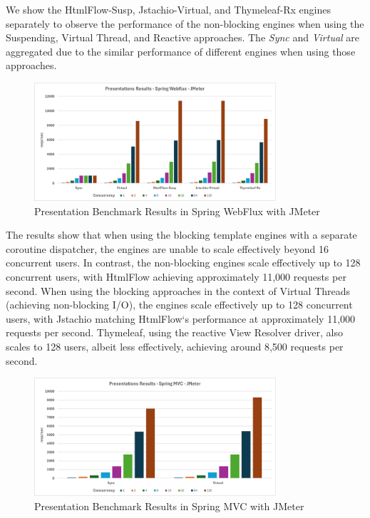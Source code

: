 We show the HtmlFlow-Susp, Jstachio-Virtual, and Thymeleaf-Rx engines
separately to observe the performance of the non-blocking engines when using
the Suspending, Virtual Thread, and Reactive approaches. The \textit{Sync} and
\textit{Virtual} are aggregated due to the similar performance of different
engines when using those approaches.

\begin{figure}[h]
     \isPreprints{\centering}{}
     \includegraphics[width=0.8\textwidth]{./Graphs/presentations-webflux-jmeter.png}
     \caption{Presentation Benchmark Results in Spring WebFlux with JMeter}\label{fig:presentations-webflux-jmeter}
\end{figure}

The results show that when using the blocking template engines with a separate
coroutine dispatcher, the engines are unable to scale effectively beyond 16
concurrent users. In contrast, the non-blocking engines scale effectively up to
128 concurrent users, with HtmlFlow achieving approximately 11,000 requests per
second. When using the blocking approaches in the context of Virtual Threads
(achieving non-blocking I/O), the engines scale effectively up to 128
concurrent users, with Jstachio matching HtmlFlow`s performance at
approximately 11,000 requests per second. Thymeleaf, using the reactive View
Resolver driver, also scales to 128 users, albeit less effectively, achieving
around 8,500 requests per second.

\begin{figure}[h]
     \isPreprints{\centering}{}
     \includegraphics[width=0.8\textwidth]{./Graphs/presentations-springmvc-jmeter.png}
     \caption{Presentation Benchmark Results in Spring MVC with JMeter}\label{fig:presentations-springmvc-jmeter}
\end{figure}

